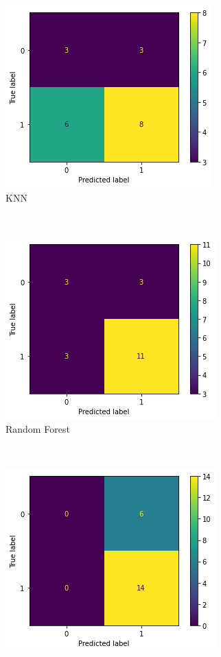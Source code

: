 \begin{figure}[htb] 
    \centering 
    \caption{Matrizes de confusão para classificadores aplicados sobre dados de seções para impacto mensal}
    \label{fig:base-de-dados-24.1-confusion-matrix-monthly-secao}
    \begin{subfigure}[b]{0.45\textwidth}
        \includegraphics[scale=0.75]{images/base-de-dados-24.3-confusion-matrix-knn-monthly-secao.png}
        \caption{KNN}
        \label{fig:resultados:base-de-dados-24.3-confusion-matrix-knn-monthly-secao}
    \end{subfigure} ~ \quad
    \begin{subfigure}[b]{0.45\textwidth}
        \includegraphics[scale=0.75]{images/base-de-dados-24.1-confusion-matrix-randomforest-monthly-secao.png}
        \caption{Random Forest}
        \label{fig:resultados:base-de-dados-24.1-confusion-matrix-randomforest-monthly-secao}
    \end{subfigure} \\
    \begin{subfigure}[b]{0.45\textwidth}
        \includegraphics[scale=0.75]{images/base-de-dados-24.1-confusion-matrix-logisticregression-monthly-secao.png}

\end{subfigure}
\end{figure}
